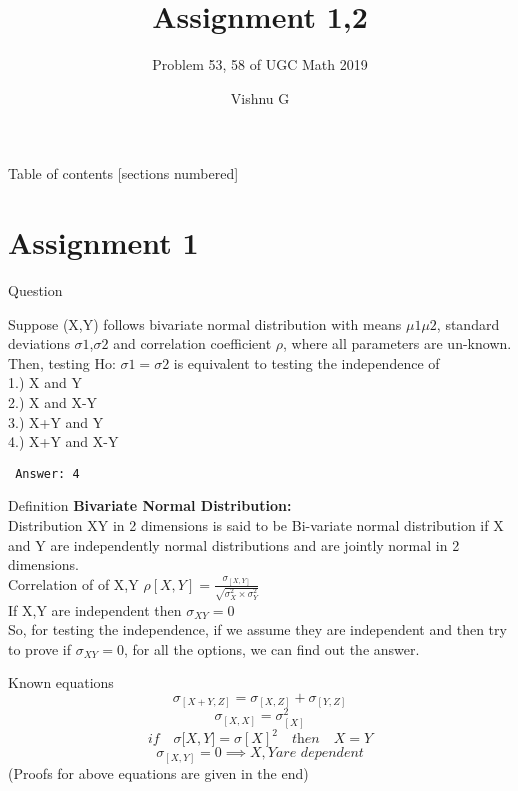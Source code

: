 \documentclass[10pt]{beamer}
\title{Assignment 1,2}
\subtitle{Problem 53, 58 of UGC Math 2019}
\date{}
\author{Vishnu G}
\institute{Indian Institute of Technology Hyderabad}
\begin{document}
\maketitle

\begin{frame}{Table of contents}
  [sections numbered]
  \tableofcontents%
\end{frame}

\section[Assignment 1]{Assignment 1}

\begin{frame}[fragile]{Question}

Suppose (X,Y) follows bivariate normal distribution with means $\mu1  \mu2$, standard deviations $\sigma1$,$\sigma2$ and correlation coefficient $\rho$, where all parameters are un-known. Then, testing Ho: $\sigma1=\sigma2$ is equivalent to testing the independence of  
\\
1.) X and Y \\
2.) X and X-Y \\
3.) X+Y and Y \\
4.) X+Y and X-Y \\

 \begin{verbatim}
 Answer: 4
 \end{verbatim}
\end{frame}
\begin{frame}[fragile]{Definition}
\large \textbf{Bivariate Normal Distribution:}\\
\small Distribution XY in 2 dimensions is said to be Bi-variate normal distribution if X and Y are independently normal distributions and are jointly normal in 2 dimensions. \\
Correlation of of X,Y $\rho[X,Y] = \frac{\sigma_{[X,Y]} } {\sqrt{\sigma_X^2 \times \sigma_Y^2}}$\\
If X,Y are independent then $\sigma_{XY}=0$\\
So, for testing the independence, if we assume they are independent and then try to prove if $\sigma_{XY}=0$, for all the options, we can find out the answer.
\end{frame}
\begin{frame}{Known equations}
\begin{equation} \label{eu_eqn_1}
  \sigma_{[X+Y,Z]} = \sigma_{[X,Z]} + \sigma_{[Y,Z]}
\end{equation}
\begin{equation} \label{eu_eqn_2}
  \sigma_{[X,X]} = \sigma_{[X]}^2
\end{equation}
\begin{equation} \label{eu_eqn_3}
  \textit{if}\quad \sigma{[X,Y}] = \sigma{[X]}^2 \quad \textit{then} \quad X=Y
\end{equation}
\begin{equation} \label{eu_eqn_4}
  \sigma_{[X,Y]} = 0 \implies X,Y \textit{are dependent}
\end{equation}
\small (Proofs for above equations are given in the end)
\end{frame}
\end{document}
